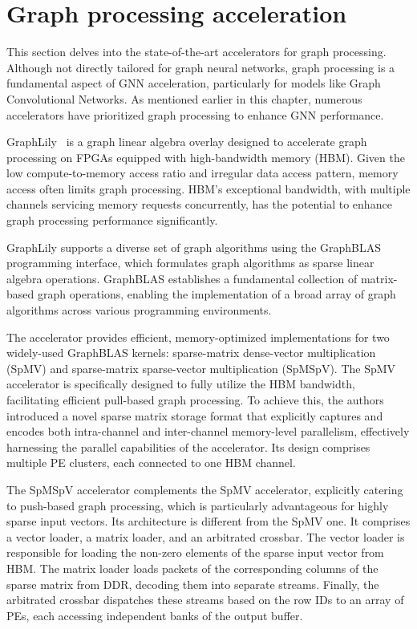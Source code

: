\section{Graph processing acceleration}
\label{sec:hbm-equipped-fpga-accelerators}%

This section delves into the state-of-the-art accelerators for graph processing.
Although not directly tailored for graph neural networks, graph processing is a fundamental aspect of GNN acceleration, particularly for models like Graph Convolutional Networks.
As mentioned earlier in this chapter, numerous accelerators have prioritized graph processing to enhance GNN performance.

GraphLily~\cite{9643582} is a graph linear algebra overlay designed to accelerate graph processing on FPGAs equipped with high-bandwidth memory (HBM).
Given the low compute-to-memory access ratio and irregular data access pattern, memory access often limits graph processing.
HBM's exceptional bandwidth, with multiple channels servicing memory requests concurrently, has the potential to enhance graph processing performance significantly.

GraphLily supports a diverse set of graph algorithms using the GraphBLAS~\cite{DBLP:journals/corr/KepnerABBFGHKLM16} programming interface, which formulates graph algorithms as sparse linear algebra operations.
GraphBLAS establishes a fundamental collection of matrix-based graph operations, enabling the implementation of a broad array of graph algorithms across various programming environments.

The accelerator provides efficient, memory-optimized implementations for two widely-used GraphBLAS kernels: sparse-matrix dense-vector multiplication (SpMV) and sparse-matrix sparse-vector multiplication (SpMSpV).
The SpMV accelerator is specifically designed to fully utilize the HBM bandwidth, facilitating efficient pull-based graph processing.
To achieve this, the authors introduced a novel sparse matrix storage format that explicitly captures and encodes both intra-channel and inter-channel memory-level parallelism, effectively harnessing the parallel capabilities of the accelerator. Its design comprises multiple PE clusters, each connected to one HBM channel.

The SpMSpV accelerator complements the SpMV accelerator, explicitly catering to push-based graph processing, which is particularly advantageous for highly sparse input vectors.
Its architecture is different from the SpMV one.
It comprises a vector loader, a matrix loader, and an arbitrated crossbar.
The vector loader is responsible for loading the non-zero elements of the sparse input vector from HBM. The matrix loader loads packets of the corresponding columns of the sparse matrix from DDR, decoding them into separate streams.
Finally, the arbitrated crossbar dispatches these streams based on the row IDs to an array of PEs, each accessing independent banks of the output buffer.

